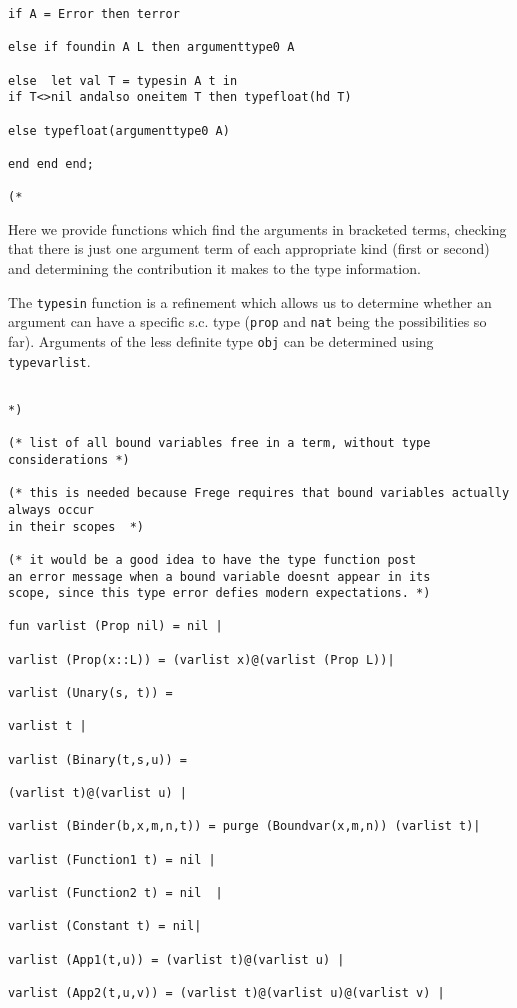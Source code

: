 \documentclass{article}
\begin{document}
{{\begin{verbatim}
if A = Error then terror

else if foundin A L then argumenttype0 A

else  let val T = typesin A t in 
if T<>nil andalso oneitem T then typefloat(hd T)

else typefloat(argumenttype0 A)

end end end;

(* 

\end{verbatim}

Here we provide functions which find the arguments in bracketed terms, checking that there is just one argument term of each appropriate kind (first or second) and determining the
contribution it makes to the type information.

The {\tt typesin} function is a refinement which allows us to determine whether an argument can have a specific s.c. type ({\tt prop} and {\tt nat} being the possibilities so far).
Arguments of the less definite type {\tt obj} can be determined using {\tt typevarlist}.

\begin{verbatim}

*)

(* list of all bound variables free in a term, without type considerations *)

(* this is needed because Frege requires that bound variables actually always occur
in their scopes  *)

(* it would be a good idea to have the type function post
an error message when a bound variable doesnt appear in its
scope, since this type error defies modern expectations. *)

fun varlist (Prop nil) = nil |

varlist (Prop(x::L)) = (varlist x)@(varlist (Prop L))|

varlist (Unary(s, t)) = 

varlist t |

varlist (Binary(t,s,u)) = 

(varlist t)@(varlist u) |

varlist (Binder(b,x,m,n,t)) = purge (Boundvar(x,m,n)) (varlist t)|

varlist (Function1 t) = nil |

varlist (Function2 t) = nil  |

varlist (Constant t) = nil|

varlist (App1(t,u)) = (varlist t)@(varlist u) |

varlist (App2(t,u,v)) = (varlist t)@(varlist u)@(varlist v) |


\end{verbatim}}}
\end{document}
